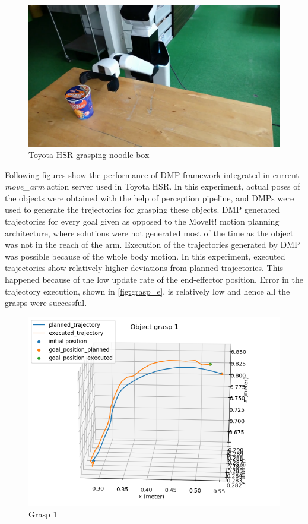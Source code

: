 \begin{figure}[H]
	\centering
	\includegraphics[width=\textwidth]{images/object_grasp.png}
	\caption{Toyota HSR grasping noodle box}
	\label{fig:object_grasp}
\end{figure}

Following figures show the performance of DMP framework integrated in current \textit{move\_arm} action server used in Toyota HSR. In this experiment, actual poses of the objects were obtained with the help of perception pipeline, and DMPs were used to generate the trejectories for grasping these objects. DMP generated trajectories for every goal given as opposed to the MoveIt! motion planning architecture, where solutions were not generated most of the time as the object was not in the reach of the arm. Execution of the trajectories generated by DMP was possible because of the whole body motion. In this experiment, executed trajectories show relatively higher deviations from planned trajectories. This happened because of the low update rate of the end-effector position. Error in the trajectory execution, shown in \ref{fig:grasp_e}, is relatively low and hence all the grasps were successful. 

\begin{figure}[H]
	\centering
	\includegraphics[scale=0.7]{images/HSR_4/1.png}
	\caption{Grasp 1}
	\label{fig:grasp_1}
\end{figure}

